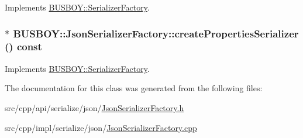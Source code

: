 Implements \hyperlink{classBUSBOY_1_1SerializerFactory_a76f6c404097a5412b5831eb38066e1e2}{BUSBOY::SerializerFactory}.\hypertarget{classBUSBOY_1_1JsonSerializerFactory_aa93357994dab0bf30dca30e00959eb2d}{
\subsubsection[{createPropertiesSerializer}]{ $\ast$ BUSBOY::JsonSerializerFactory::createPropertiesSerializer () const}}
\label{classBUSBOY_1_1JsonSerializerFactory_aa93357994dab0bf30dca30e00959eb2d}


Implements \hyperlink{classBUSBOY_1_1SerializerFactory_a3e5cee585280539a83558d4553a8d77a}{BUSBOY::SerializerFactory}.

The documentation for this class was generated from the following files:\begin{DoxyCompactItemize}
\item 
src/cpp/api/serialize/json/\hyperlink{JsonSerializerFactory_8h}{JsonSerializerFactory.h}\item 
src/cpp/impl/serialize/json/\hyperlink{JsonSerializerFactory_8cpp}{JsonSerializerFactory.cpp}\end{DoxyCompactItemize}
